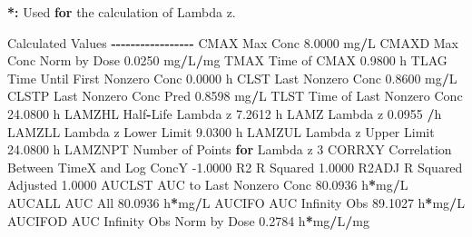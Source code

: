 \documentclass[
  10pt,
]{krantz}
\makeatletter
\newenvironment{Shaded}{\begin{snugshade}}{\end{snugshade}}
\newcommand{\ControlFlowTok}[1]{\textcolor[rgb]{0.13,0.29,0.53}{\textbf{#1}}}
\newcommand{\DecValTok}[1]{\textcolor[rgb]{0.00,0.00,0.81}{#1}}
\newcommand{\ErrorTok}[1]{\textcolor[rgb]{0.64,0.00,0.00}{\textbf{#1}}}
\newcommand{\FloatTok}[1]{\textcolor[rgb]{0.00,0.00,0.81}{#1}}
\newcommand{\NormalTok}[1]{#1}
\newcommand{\OperatorTok}[1]{\textcolor[rgb]{0.81,0.36,0.00}{\textbf{#1}}}
\newcommand{\StringTok}[1]{\textcolor[rgb]{0.31,0.60,0.02}{#1}}
\newenvironment{kframe}{%
\medskip{}
\setlength{\fboxsep}{.8em}
 \def\at@end@of@kframe{}%
 \ifinner\ifhmode%
  \def\at@end@of@kframe{\end{minipage}}%
  \begin{minipage}{\columnwidth}%
 \fi\fi%
 \def\FrameCommand##1{\hskip\@totalleftmargin \hskip-\fboxsep
 \colorbox{shadecolor}{##1}\hskip-\fboxsep
     \hskip-\linewidth \hskip-\@totalleftmargin \hskip\columnwidth}%
 \MakeFramed {\advance\hsize-\width
   \@totalleftmargin\z@ \linewidth\hsize
   \@setminipage}}%
 {\par\unskip\endMakeFramed%
 \at@end@of@kframe}
\renewenvironment{Shaded}{\begin{kframe}}{\end{kframe}}
\makeatother
\begin{document}
\begin{Shaded}
\begin{Highlighting}[]
\OperatorTok{*}\ErrorTok{:}\StringTok{ }\NormalTok{Used }\ControlFlowTok{for}\NormalTok{ the calculation of Lambda z.}


\NormalTok{Calculated Values}
\OperatorTok{{-}{-}{-}{-}{-}{-}{-}{-}{-}{-}{-}{-}{-}{-}{-}{-}{-}}
\NormalTok{CMAX       Max Conc                                        }\FloatTok{8.0000}\NormalTok{ mg}\OperatorTok{/}\NormalTok{L}
\NormalTok{CMAXD      Max Conc Norm by Dose                           }\FloatTok{0.0250}\NormalTok{ mg}\OperatorTok{/}\NormalTok{L}\OperatorTok{/}\NormalTok{mg}
\NormalTok{TMAX       Time of CMAX                                    }\FloatTok{0.9800}\NormalTok{ h}
\NormalTok{TLAG       Time Until First Nonzero Conc                   }\FloatTok{0.0000}\NormalTok{ h}
\NormalTok{CLST       Last Nonzero Conc                               }\FloatTok{0.8600}\NormalTok{ mg}\OperatorTok{/}\NormalTok{L}
\NormalTok{CLSTP      Last Nonzero Conc Pred                          }\FloatTok{0.8598}\NormalTok{ mg}\OperatorTok{/}\NormalTok{L}
\NormalTok{TLST       Time of Last Nonzero Conc                      }\FloatTok{24.0800}\NormalTok{ h}
\NormalTok{LAMZHL     Half}\OperatorTok{{-}}\NormalTok{Life Lambda z                              }\FloatTok{7.2612}\NormalTok{ h}
\NormalTok{LAMZ       Lambda z                                        }\FloatTok{0.0955} \OperatorTok{/}\NormalTok{h}
\NormalTok{LAMZLL     Lambda z Lower Limit                            }\FloatTok{9.0300}\NormalTok{ h}
\NormalTok{LAMZUL     Lambda z Upper Limit                           }\FloatTok{24.0800}\NormalTok{ h}
\NormalTok{LAMZNPT    Number of Points }\ControlFlowTok{for}\NormalTok{ Lambda z                   }\DecValTok{3}
\NormalTok{CORRXY     Correlation Between TimeX and Log ConcY        }\FloatTok{{-}1.0000} 
\NormalTok{R2         R Squared                                       }\FloatTok{1.0000} 
\NormalTok{R2ADJ      R Squared Adjusted                              }\FloatTok{1.0000} 
\NormalTok{AUCLST     AUC to Last Nonzero Conc                       }\FloatTok{80.0936}\NormalTok{ h}\OperatorTok{*}\NormalTok{mg}\OperatorTok{/}\NormalTok{L}
\NormalTok{AUCALL     AUC All                                        }\FloatTok{80.0936}\NormalTok{ h}\OperatorTok{*}\NormalTok{mg}\OperatorTok{/}\NormalTok{L}
\NormalTok{AUCIFO     AUC Infinity Obs                               }\FloatTok{89.1027}\NormalTok{ h}\OperatorTok{*}\NormalTok{mg}\OperatorTok{/}\NormalTok{L}
\NormalTok{AUCIFOD    AUC Infinity Obs Norm by Dose                   }\FloatTok{0.2784}\NormalTok{ h}\OperatorTok{*}\NormalTok{mg}\OperatorTok{/}\NormalTok{L}\OperatorTok{/}\NormalTok{mg}

\end{Highlighting}
\end{Shaded}
\end{document}
